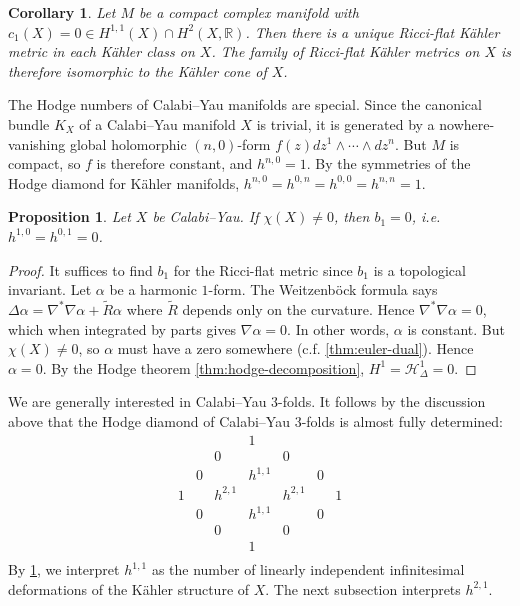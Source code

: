 \documentclass{report}
\theoremstyle{plain}
\newtheorem{proposition}[theorem]{Proposition}
\newtheorem{corollary}[theorem]{Corollary}
\theoremstyle{definition}
\theoremstyle{remark}
\newcommand{\bR}{\mathbb{R}}
\newcommand{\cH}{\mathcal{H}}
\begin{document}
\begin{corollary} \label{thm:h11-kahler-deformation}
  Let $M$ be a compact complex manifold with $c_1(X) = 0 \in
  H^{1,1}(X) \cap H^2(X, \bR)$. Then there is a unique Ricci-flat
  K\"ahler metric in each K\"ahler class on $X$. The family of
  Ricci-flat K\"ahler metrics on $X$ is therefore isomorphic to the
  K\"ahler cone of $X$.
\end{corollary}

The Hodge numbers of Calabi--Yau manifolds are special. Since the
canonical bundle $K_X$ of a Calabi--Yau manifold $X$ is trivial, it is
generated by a nowhere-vanishing global holomorphic $(n,0)$-form $f(z)
dz^1 \wedge \cdots \wedge dz^n$. But $M$ is compact, so $f$ is
therefore constant, and $h^{n,0} = 1$. By the symmetries of the Hodge
diamond for K\"ahler manifolds, $h^{n,0} = h^{0,n} = h^{0,0} = h^{n,n}
= 1$.

\begin{proposition}
  Let $X$ be Calabi--Yau. If $\chi(X) \neq 0$, then $b_1 = 0$,
  i.e. $h^{1,0} = h^{0,1} = 0$.
\end{proposition}

\begin{proof}
  It suffices to find $b_1$ for the Ricci-flat metric since $b_1$ is a
  topological invariant. Let $\alpha$ be a harmonic $1$-form. The
  Weitzenb\"ock formula says $\Delta \alpha = \nabla^*\nabla\alpha +
  \tilde{R}\alpha$ where $\tilde{R}$ depends only on the curvature.
  Hence $\nabla^*\nabla\alpha = 0$, which when integrated by parts
  gives $\nabla\alpha = 0$. In other words, $\alpha$ is constant. But
  $\chi(X) \neq 0$, so $\alpha$ must have a zero somewhere (c.f.
  \ref{thm:euler-dual}). Hence $\alpha = 0$. By the Hodge theorem
  \ref{thm:hodge-decomposition}, $H^1 = \cH^1_{\Delta} = 0$.
\end{proof}

We are generally interested in Calabi--Yau $3$-folds. It follows by
the discussion above that the Hodge diamond of Calabi--Yau $3$-folds
is almost fully determined:
\[ \begin{array}{ccccccc}
  & && 1 && & \\
  && 0 && 0 && \\
  & 0 && h^{1,1} && 0 & \\
  1 && h^{2,1} && h^{2,1} && 1 \\
  & 0 && h^{1,1} && 0 & \\
  && 0 && 0 && \\
  & && 1 && & \\
\end{array} \]
By \ref{thm:h11-kahler-deformation}, we interpret $h^{1,1}$ as the
number of linearly independent infinitesimal deformations of the
K\"ahler structure of $X$. The next subsection interprets $h^{2,1}$.
\end{document}
